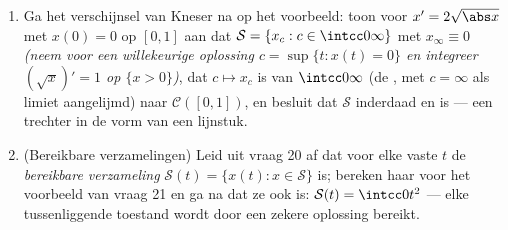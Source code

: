 \begin{problem}[{Weekendopgave --- bestaan van oplossingen van $x'
= f(t, x)$ zonder Lipschitz}]
\begin{enumerate}[resume]
  \item Ga het verschijnsel van Kneser na op het voorbeeld: toon
        voor $x' = 2\sqrt{\abs x}$ met $x(0) = 0$ op $[0, 1]$ aan
        dat $\mathcal S = \{x_c : c \in \intcc0\infty\}$ met
        $x_\infty \equiv 0$ \emph{(neem voor een willekeurige
        oplossing $c = \sup\{t : x(t) = 0\}$ en integreer $(\sqrt
        x)' = 1$ op $\{x > 0\}$)}, dat $c \mapsto x_c$  is
        van $\intcc0\infty$ (de , met $c =
        \infty$ als limiet aangelijmd) naar $\mathcal C([0,1])$,
        en besluit dat $\mathcal S$ inderdaad  en
         is --- een trechter in de vorm van een
        lijnstuk.
  \item (Bereikbare verzamelingen) Leid uit vraag 20 af dat voor
        elke vaste $t$ de \emph{bereikbare verzameling} $\mathcal
        S(t) = \{x(t) : x \in \mathcal S\}$  is; bereken
        haar voor het voorbeeld van vraag 21 en ga na dat ze ook
         is: $\mathcal S(t) = \intcc0{t^2}$ --- elke
        tussenliggende toestand wordt door een zekere oplossing
        bereikt.
\end{enumerate}


\end{problem}
